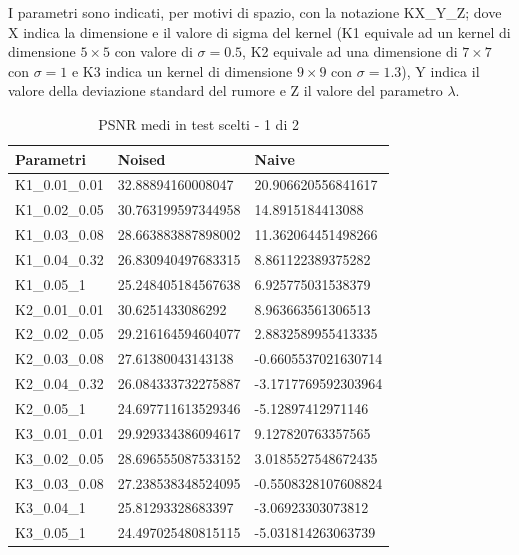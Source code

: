 \documentclass[12pt]{article}
\begin{document}
    I parametri sono indicati, per motivi di spazio, con la notazione KX\_Y\_Z; dove X indica la dimensione e il valore di sigma del kernel (K1 equivale ad un kernel di dimensione $5\times5$ con valore di $\sigma=0.5$, K2 equivale ad una dimensione di $7\times7$ con $\sigma=1$ e K3 indica un kernel di dimensione $9\times9$ con $\sigma=1.3$), Y indica il valore della deviazione standard del rumore e Z il valore del parametro $\lambda$.

    \begin{table}[!ht]
    \centering
    \begin{tabular}{|l|l|l|}
    \hline
        Parametri & Noised & Naive \\ \hline
        K1\_0.01\_0.01 & 32.88894160008047 & 20.906620556841617 \\ \hline
        K1\_0.02\_0.05 & 30.763199597344958 & 14.8915184413088 \\ \hline
        K1\_0.03\_0.08 & 28.663883887898002 & 11.362064451498266 \\ \hline
        K1\_0.04\_0.32 & 26.830940497683315 & 8.861122389375282 \\ \hline
        K1\_0.05\_1 & 25.248405184567638 & 6.925775031538379 \\ \hline
        K2\_0.01\_0.01 & 30.6251433086292 & 8.963663561306513 \\ \hline
        K2\_0.02\_0.05 & 29.216164594604077 & 2.8832589955413335 \\ \hline
        K2\_0.03\_0.08 & 27.61380043143138 & -0.6605537021630714 \\ \hline
        K2\_0.04\_0.32 & 26.084333732275887 & -3.1717769592303964 \\ \hline
        K2\_0.05\_1 & 24.697711613529346 & -5.12897412971146 \\ \hline
        K3\_0.01\_0.01 & 29.929334386094617 & 9.127820763357565 \\ \hline
        K3\_0.02\_0.05 & 28.696555087533152 & 3.0185527548672435 \\ \hline
        K3\_0.03\_0.08 & 27.238538348524095 & -0.5508328107608824 \\ \hline
        K3\_0.04\_1 & 25.81293328683397 & -3.06923303073812 \\ \hline
        K3\_0.05\_1 & 24.497025480815115 & -5.031814263063739 \\ \hline
    \end{tabular}
    \caption{PSNR medi in test scelti - 1 di 2}
    \label{table:2}
    \end{table}
\end{document}
